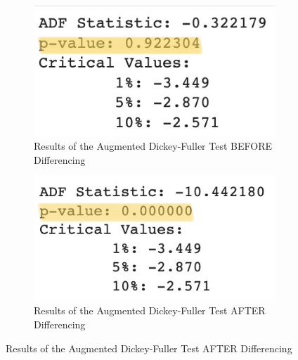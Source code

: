 \documentclass[12pt]{article}
\begin{document}
\begin{figure}[H]
	\centering
	\begin{subfigure}{1.0\textwidth}
		\includegraphics[width=\textwidth]{images/adf_pre.png}
		\caption{Results of the Augmented Dickey-Fuller Test BEFORE Differencing}
	\end{subfigure}

    \bigskip

	\begin{subfigure}{1.0\textwidth}
		\includegraphics[width=\textwidth]{images/adf_post.png}
		\caption{Results of the Augmented Dickey-Fuller Test AFTER Differencing}
	\end{subfigure}
\end{figure}

\pagebreak

\begin{center}
        \textbf{\Large{}}
\end{center}
\end{document}
